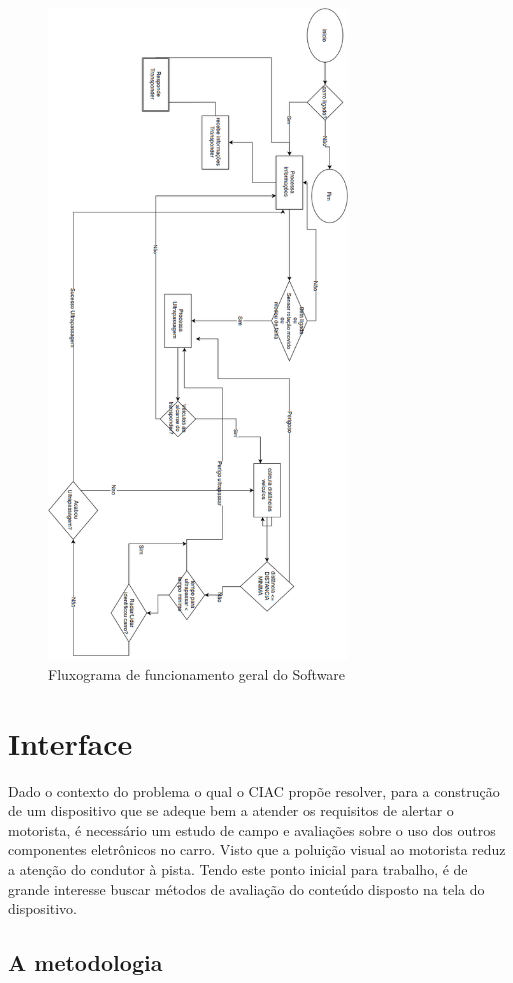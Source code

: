 \begin{figure}[!h]
  \centering
  \includegraphics[width=300px, scale=1]{figuras/func_soft}
  \caption{Fluxograma de funcionamento geral do Software}
\label{fig:func_soft}
\end{figure}

\section {Interface}

Dado o contexto do problema o qual o CIAC propõe resolver, para a construção de um dispositivo que se adeque bem a atender os requisitos de alertar o motorista, é necessário um estudo de campo e avaliações sobre o uso dos outros componentes eletrônicos no carro. Visto que a poluição visual ao motorista reduz a atenção do condutor à pista. Tendo este ponto inicial para trabalho, é de grande interesse buscar métodos de avaliação do conteúdo disposto na tela do dispositivo.

\subsection{A metodologia}


